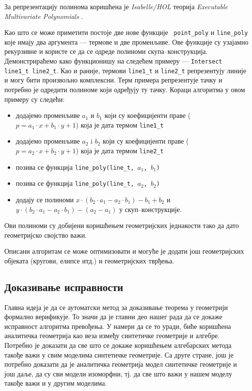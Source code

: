 За репрезентацију полинома коришћена је \emph{Isabelle/HOL} теорија
\emph{Executable Multivariate Polynomials}
\cite{sternagel2013executable}.

\begin{sloppypar}
Као што се може приметити постоје две нове функције \mbox{{\tt
    point\_poly}} и \mbox{{\tt line\_poly}} које имају два аргумента
--- термове и две променљиве. Ове функције су узајамно рекурзивне и
користе се да се одреде полиноми скупа--конструкција. Демонстрираћемо
како функционишу на следећем примеру --- {\tt Intersect line1\_t
  line2\_t}. Као и раније, термови {\tt line1\_t} и {\tt line2\_t}
репрезентују линије и могу бити произвољно комплексни. Терм примера
репрезентује тачку и потребно је одредити полиноме који одређују ту
тачку. Кораци алгоритма у овом примеру су следећи:
\end{sloppypar}
\begin{itemize}
\item додајемо променљиве $a_1$ и $b_1$ који су коефицијенти праве ($p
  = a_1\cdot x + b_1\cdot y + 1$) која је дата термом {\tt line1\_t}
\item додајемо променљиве $a_2$ i $b_2$ који су коефицијенти праве ($p
  = a_2\cdot x + b_2\cdot y + 1$) која је дата термом {\tt line2\_t}
 \item позива се функција {\tt line\_poly(line\_t, $a_1$, $b_1$)}
 \item позива се функција {\tt line\_poly(line\_t, $a_2$, $b_2$)}
 \item додају се полиноми $x\cdot(b_2\cdot a_1 - a_2\cdot b_1) - b_1 +
   b_2$ и $y\cdot(b_2\cdot a_1 - a_2\cdot b_1) - (a_2 - a_1)$ у
   скуп--конструкције.
\end{itemize}
Ови полиноми су добијени коришћењем геометријских једнакости тако да
дато геометријско својство важи.

Описани алгоритам се може оптимизовати и могуће је додати још
геометријских објеката (кругови, елипсе итд.) и геометријских тврђења.

\subsection{Доказивање исправности}

Главна идеја је да се аутоматски метод за доказивање теорема у
геометрији формално верификује. То значи да је главни део нашег рада
да се докаже исправност алгоритма превођења. У намери да се то
уради, биће коришћена аналитичка геометрија као веза између синтетичке
геометрије и алгебре. Потребно је доказати да све што се докаже
коришћењем алгебарских метода такође важи у свим моделима синтетичке
геометрије. Са друге стране, још је потребно доказати да је аналитичка
геометрија модел синтетичке геометрије и још даље, да су сви модели
изоморфни, тј. да све што важи у нашем моделу такође важи и у другим
моделима.

